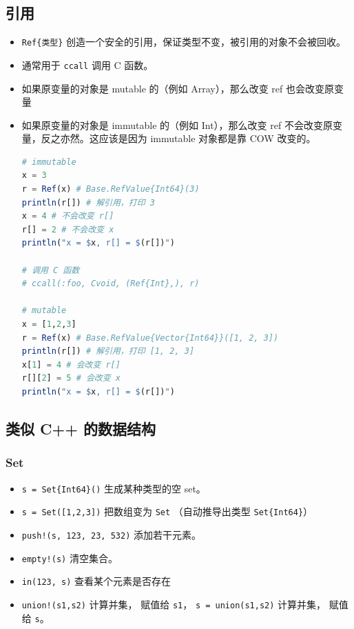 \subsection{引用}
\begin{itemize}
\item \verb`Ref{类型}` 创造一个安全的引用，保证类型不变，被引用的对象不会被回收。
\item 通常用于 \verb`ccall` 调用 C 函数。
\item 如果原变量的对象是 mutable 的（例如 Array），那么改变 ref 也会改变原变量
\item 如果原变量的对象是 immutable 的（例如 Int），那么改变 ref 不会改变原变量，反之亦然。这应该是因为 immutable 对象都是靠 COW 改变的。
\begin{lstlisting}[language=julia]
# immutable
x = 3
r = Ref(x) # Base.RefValue{Int64}(3)
println(r[]) # 解引用，打印 3
x = 4 # 不会改变 r[]
r[] = 2 # 不会改变 x
println("x = $x, r[] = $(r[])")

# 调用 C 函数
# ccall(:foo, Cvoid, (Ref{Int},), r)

# mutable
x = [1,2,3]
r = Ref(x) # Base.RefValue{Vector{Int64}}([1, 2, 3])
println(r[]) # 解引用，打印 [1, 2, 3]
x[1] = 4 # 会改变 r[]
r[][2] = 5 # 会改变 x
println("x = $x, r[] = $(r[])")
\end{lstlisting}
\end{itemize}


\subsection{类似 C++ 的数据结构}
\subsubsection{Set}
\begin{itemize}
\item \verb`s = Set{Int64}()` 生成某种类型的空 set。
\item \verb`s = Set([1,2,3])` 把数组变为 \verb`Set` （自动推导出类型 \verb`Set{Int64}`）
\item \verb`push!(s, 123, 23, 532)` 添加若干元素。
\item \verb`empty!(s)` 清空集合。
\item \verb`in(123, s)` 查看某个元素是否存在
\item \verb`union!(s1,s2)` 计算并集， 赋值给 \verb`s1`， \verb`s = union(s1,s2)` 计算并集， 赋值给 \verb`s`。
\end{itemize}

